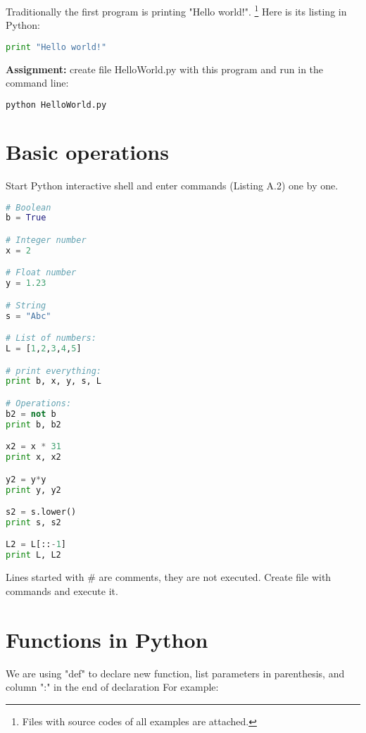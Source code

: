 Traditionally the first program is printing "Hello world!".
\footnote{Files with source codes of all examples are attached.}
Here is its listing in Python:

\begin{lstlisting}[style=codelst2, language=Python,caption={Python: Hello World!}]
print "Hello world!"
\end{lstlisting}

\bigskip
\begin{tcolorbox}
\textbf{Assignment:} create file HelloWorld.py with this program
and run in the command line:
\begin{lstlisting}[language=bash,frame=single,caption={Python: run HelloWorld.py}]
python HelloWorld.py
\end{lstlisting}
\end{tcolorbox}

\section{Basic operations}

Start Python interactive shell and enter commands (Listing A.2) one by one.

\begin{lstlisting}[style=codelst,language=Python,caption={Basic types}]
# Boolean
b = True

# Integer number
x = 2

# Float number
y = 1.23

# String
s = "Abc"

# List of numbers:
L = [1,2,3,4,5]

# print everything:
print b, x, y, s, L

# Operations:
b2 = not b
print b, b2

x2 = x * 31
print x, x2

y2 = y*y
print y, y2

s2 = s.lower()
print s, s2

L2 = L[::-1]
print L, L2
\end{lstlisting}
Lines started with \# are comments, they are not executed.
Create file with commands and execute it. 

\section{Functions in Python}

We are using "def" to declare new function, list parameters in
parenthesis, and column ":" in the end of declaration
For example:

